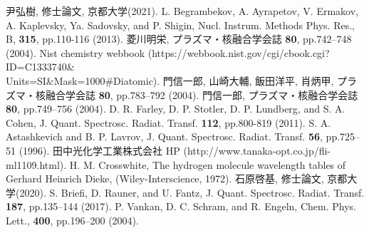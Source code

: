 \begin{thebibliography}{99}
     尹弘樹, 修士論文, 京都大学(2021).
     L. Begrambekov, A. Ayrapetov, V. Ermakov, A. Kaplevsky, Ya. Sadovsky, and P. Shigin, Nucl. Instrum. Methods Phys. Res., B, \textbf{315}, pp.110-116 (2013).
     菱川明栄, プラズマ・核融合学会誌 \textbf{80}, pp.742–748 (2004).
     Nist chemistry webbook (https://webbook.nist.gov/cgi/cbook.cgi?ID=C1333740\&\\Units=SI\&Mask=1000\#Diatomic).
     門信一郎, 山崎大輔, 飯田洋平, 肖炳甲, プラズマ・核融合学会誌 \textbf{80}, pp.783–792 (2004).
     門信一郎, プラズマ・核融合学会誌 \textbf{80}, pp.749–756 (2004).
     D. R. Farley, D. P. Stotler, D. P. Lundberg, and S. A. Cohen, J. Quant. Spectrosc. Radiat. Transf. \textbf{112}, pp.800-819 (2011).
      S. A. Astashkevich and B. P. Lavrov, J. Quant. Spectrosc. Radiat. Transf. \textbf{56}, pp.725–51 (1996).
     田中光化学工業株式会社 HP (http://www.tanaka-opt.co.jp/fli-ml1109.html).
     H. M. Crosswhite, The hydrogen molecule wavelength tables of Gerhard Heinrich Dieke, (Wiley-Interscience, 1972).
     石原啓基, 修士論文, 京都大学(2020).
     S. Briefi, D. Rauner, and U. Fantz, J. Quant. Spectrosc. Radiat. Transf. \textbf{187}, pp.135–144 (2017).
     P. Vankan, D. C. Schram, and R. Engeln, Chem. Phys. Lett., \textbf{400}, pp.196–200 (2004).
\end{thebibliography}